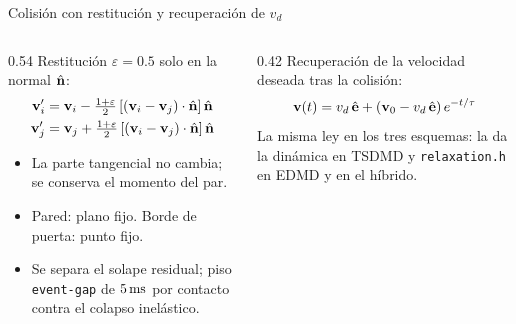\begin{frame}{Colisión con restitución y recuperación de $v_d$}
  \small
  \begin{columns}[T]
    \begin{column}{0.54\textwidth}
      Restitución $\varepsilon = 0.5$ solo en la normal $\hat{\mathbf{n}}$:
      \begin{align*}
        \mathbf{v}_i' &= \mathbf{v}_i - \tfrac{1+\varepsilon}{2}\,[(\mathbf{v}_i-\mathbf{v}_j)\cdot\hat{\mathbf{n}}]\,\hat{\mathbf{n}}\\
        \mathbf{v}_j' &= \mathbf{v}_j + \tfrac{1+\varepsilon}{2}\,[(\mathbf{v}_i-\mathbf{v}_j)\cdot\hat{\mathbf{n}}]\,\hat{\mathbf{n}}
      \end{align*}
      \begin{itemize}
        \item La parte tangencial no cambia; se conserva el momento del par.
        \item Pared: plano fijo. Borde de puerta: punto fijo.
        \item Se separa el solape residual; piso \texttt{event-gap} de $5\,\mathrm{ms}$ por contacto
          contra el colapso inelástico.
      \end{itemize}
    \end{column}
    \begin{column}{0.42\textwidth}
      Recuperación de la velocidad deseada tras la colisión:
      \[
        \mathbf{v}(t) = v_d\,\hat{\mathbf{e}} + (\mathbf{v}_0 - v_d\,\hat{\mathbf{e}})\,e^{-t/\tau}
      \]
      La misma ley en los tres esquemas: la da la dinámica en TSDMD y \texttt{relaxation.h}
      en EDMD y en el híbrido.
    \end{column}
  \end{columns}
\end{frame}

